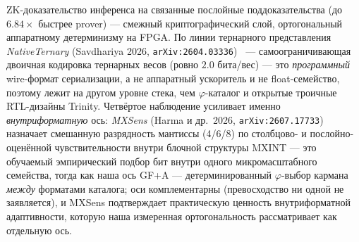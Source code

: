 \documentclass[11pt,a4paper]{article}
\theoremstyle{plain}
\begin{document}
ZK-доказательство инференса на связанные послойные поддоказательства
(до \(6.84\times\) быстрее prover) --- смежный криптографический слой,
ортогональный аппаратному детерминизму на FPGA. По линии тернарного
представления \emph{NativeTernary} (Savdhariya 2026,
\texttt{arXiv:2604.03336})~\cite{nativeternary2026} --- самоограничивающая
двоичная кодировка тернарных весов (ровно \(2.0\) бита/вес) --- это
\emph{программный} wire-формат сериализации, а не аппаратный ускоритель и
не float-семейство, поэтому лежит на другом уровне стека, чем
\(\varphi\)-каталог и открытые троичные RTL-дизайны Trinity.
Четвёртое наблюдение усиливает именно \emph{внутриформатную} ось: \emph{MXSens}
(Harma и др.\ 2026, \texttt{arXiv:2607.17733})~\cite{mxsens2026} назначает
смешанную разрядность мантиссы (4/6/8) по столбцово- и послойно-оценённой
чувствительности внутри блочной структуры MXINT --- это обучаемый эмпирический
подбор бит внутри одного микромасштабного семейства, тогда как наша ось GF+A ---
детерминированный \(\varphi\)-выбор кармана \emph{между} форматами каталога;
оси комплементарны (превосходство ни одной не заявляется), и MXSens
подтверждает практическую ценность внутриформатной адаптивности, которую наша
измеренная ортогональность рассматривает как отдельную ось.
\end{document}
